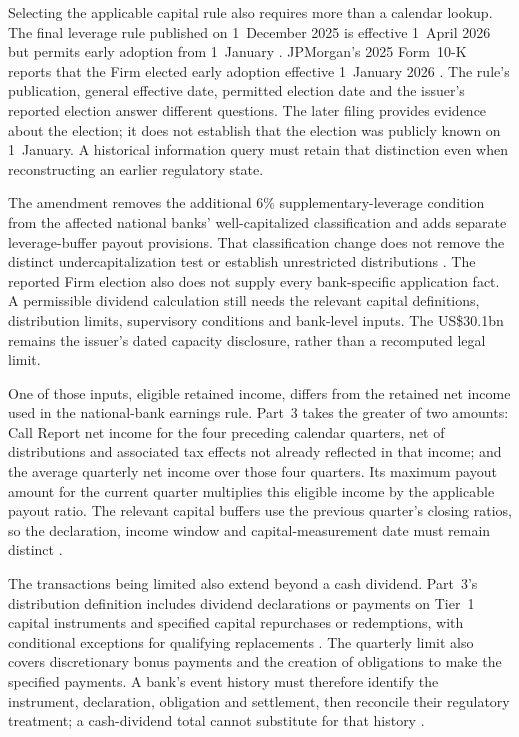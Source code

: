 Selecting the applicable capital rule also requires more than a calendar
lookup. The final leverage rule published on 1~December 2025 is effective
1~April 2026 but permits early adoption from 1~January
\citep[p.~55248]{eslrfinal2025}. JPMorgan's 2025
Form~10-K reports that the Firm elected early adoption effective 1~January
2026 \citep[p.~91]{jpmorgan2025tenk}.
The rule's publication, general effective date, permitted election date and
the issuer's reported election answer different questions. The later filing
provides evidence about the election; it does not establish that the election
was publicly known on 1~January. A historical information query must retain
that distinction even when reconstructing an earlier regulatory state.

The amendment removes the additional 6\% supplementary-leverage condition
from the affected national banks' well-capitalized classification and adds
separate leverage-buffer payout provisions. That classification change does
not remove the distinct undercapitalization test or establish unrestricted
distributions \citep[pp.~55287--55288]{eslrfinal2025}. The reported Firm election
also does not supply every bank-specific application fact. A permissible
dividend calculation still needs the relevant capital definitions, distribution
limits, supervisory conditions and bank-level inputs. The US\$30.1bn remains
the issuer's dated capacity disclosure, rather than a recomputed legal limit.


One of those inputs, eligible retained income, differs from the
retained net income used in the national-bank earnings rule. Part~3 takes the
greater of two amounts: Call Report net income for the four preceding calendar
quarters, net of distributions and associated tax effects not already reflected
in that income; and the average quarterly net income over those four quarters.
Its maximum payout amount for the current quarter multiplies this eligible
income by the applicable payout ratio. The relevant capital buffers use the
previous quarter's closing ratios, so the declaration, income window and
capital-measurement date must remain distinct
\citep[12~CFR~3.11(a)(2)--(4)]{occcapitalpayout2026}.

The transactions being limited also extend beyond a cash dividend. Part~3's
distribution definition includes dividend declarations or payments on Tier~1
capital instruments and specified capital repurchases or redemptions, with
conditional exceptions for qualifying replacements
\citep[12~CFR~3.2]{occcapitaldefinitions2026}. The quarterly limit also
covers discretionary bonus payments and the creation of obligations to make
the specified payments. A bank's event history must therefore identify the
instrument, declaration, obligation and settlement, then reconcile their
regulatory treatment; a cash-dividend total cannot substitute for that history
\citep[12~CFR~3.11(a)(4)]{occcapitalpayout2026}.

